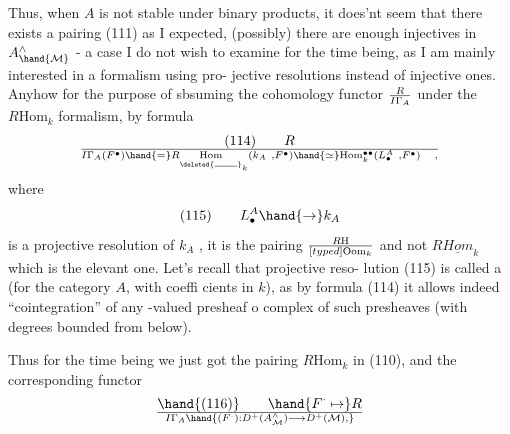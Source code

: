 Thus, when $A$ is not stable under binary products, it does'nt
seem that there exists a pairing (111) as I expected,  (possibly)
 there are enough injectives in $A^{\wedge}_{\hand{\mathcal{M}}}$ - a case I do not wish to examine
for the time being, as I am mainly interested  in a formalism using pro-%
jective resolutions instead of injective ones. Anyhow for the purpose
of sbsuming the cohomology functor $R\over{I}{\Gamma}_A$ under the $R\mathrm{Hom}_k$ formalism,
by formula
\[ (114) \qquad R\over{I}{\Gamma}_A(F^{\bullet}) \hand{=} R\underset{\deleted{\rule{1.6em}{0.35pt}}}{\mathrm{Hom}}_k(k_A \ , F^{\bullet}) \hand{\simeq} \mathrm{Hom}_k^{\bullet\bullet}(L^A_{\bullet} \ , F^{\bullet}) \quad , \]
where
\[ (115) \qquad L^A_{\bullet} \hand{\to} k_A \]
is a projective resolution of $k_A$ , it is the pairing $R\mathrm{H}\over[typed]{\mathrm{O}}{\mathrm{o}}\mathrm{m}_k$ and not
$R\underline{Hom}_k$ which is the elevant one. Let's recall that  projective reso-%
lution (115) is called a \hand{\uline{\textcolor{black}{cointegrator}}} (for the category $A$, with coeffi%
cients in $k$), as by formula (114) it allows indeed  ``cointegration''
of any -valued presheaf o complex of such presheaves (with degrees
bounded from below).

Thus for the time being we just got the pairing $R\mathrm{Hom}_k$ in (110),
and the corresponding functor
\[ \hand{(116)} \qquad \hand{F^{\cdot} \mapsto} R\over{I}{\Gamma}_A\hand{(F^{\cdot}) : D^+(A^{\wedge}_{\mathcal{M}}) \longrightarrow D^+(\mathcal{M}) ,} \]

